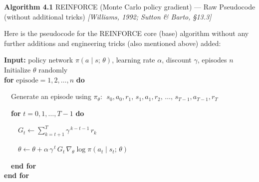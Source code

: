 \documentclass[11pt]{article}
\begin{document}
    \label{pseudo-4-1}

    \begin{pseudobox}

\textbf{Algorithm 4.1} REINFORCE (Monte Carlo policy gradient) --- Raw
Pseudocode (without additional tricks) \emph{{[}Williams, 1992; Sutton
\& Barto, §13.3{]}}

\tcbline

Here is the pseudocode for the REINFORCE core (base) algorithm without
any further additions and engineering tricks (also mentioned above)
added:

\textbf{Input:} policy network \(\pi(a \mid s;\, \theta)\), learning
rate \(\alpha\), discount \(\gamma\), episodes \(n\)\\
Initialize \(\theta\) randomly\\
\textbf{for} \(\text{episode} = 1, 2, \ldots, n\) \textbf{do}\\
\strut ~~Generate an episode using \(\pi_\theta\):
\(\;s_0, a_0, r_1,\, s_1, a_1, r_2,\, \ldots,\, s_{T-1}, a_{T-1}, r_T\)\\
\strut ~~\textbf{for} \(t = 0, 1, \ldots, T - 1\) \textbf{do}\\
\strut ~~~~\(G_t \leftarrow \displaystyle\sum_{k = t + 1}^{T} \gamma^{\,k - t - 1}\, r_k\)\\
\strut ~~~~\(\theta \leftarrow \theta + \alpha\, \gamma^{\,t}\, G_t\, \nabla_{\theta} \log \pi(a_t \mid s_t;\, \theta)\)\\
\strut ~~\textbf{end for}\\
\textbf{end for}

\end{pseudobox}
\end{document}
